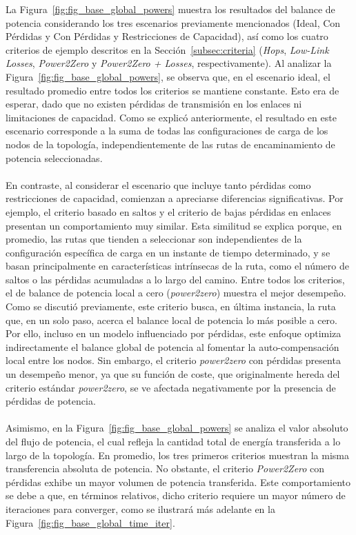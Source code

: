 La Figura~\ref{fig:fig_base_global_powers} muestra los resultados del balance de potencia considerando los tres escenarios previamente mencionados (Ideal, Con Pérdidas y Con Pérdidas y Restricciones de Capacidad), así como los cuatro criterios de ejemplo descritos en la Sección~\ref{subsec:criteria} (\textit{Hops}, \textit{Low-Link Losses}, \textit{Power2Zero} y \textit{Power2Zero + Losses}, respectivamente). Al analizar la Figura~\ref{fig:fig_base_global_powers}, se observa que, en el escenario ideal, el resultado promedio entre todos los criterios se mantiene constante. Esto era de esperar, dado que no existen pérdidas de transmisión en los enlaces ni limitaciones de capacidad. Como se explicó anteriormente, el resultado en este escenario corresponde a la suma de todas las configuraciones de carga de los nodos de la topología, independientemente de las rutas de encaminamiento de potencia seleccionadas. \\
\\
En contraste, al considerar el escenario que incluye tanto pérdidas como restricciones de capacidad, comienzan a apreciarse diferencias significativas. Por ejemplo, el criterio basado en saltos y el criterio de bajas pérdidas en enlaces presentan un comportamiento muy similar. Esta similitud se explica porque, en promedio, las rutas que tienden a seleccionar son independientes de la configuración específica de carga en un instante de tiempo determinado, y se basan principalmente en características intrínsecas de la ruta, como el número de saltos o las pérdidas acumuladas a lo largo del camino.  Entre todos los criterios, el de balance de potencia local a cero (\textit{power2zero}) muestra el mejor desempeño. Como se discutió previamente, este criterio busca, en última instancia, la ruta que, en un solo paso, acerca el balance local de potencia lo más posible a cero. Por ello, incluso en un modelo influenciado por pérdidas, este enfoque optimiza indirectamente el balance global de potencia al fomentar la auto-compensación local entre los nodos. Sin embargo, el criterio \textit{power2zero} con pérdidas presenta un desempeño menor, ya que su función de coste, que originalmente hereda del criterio estándar \textit{power2zero}, se ve afectada negativamente por la presencia de pérdidas de potencia.\\
\\
Asimismo, en la Figura~\ref{fig:fig_base_global_powers} se analiza el valor absoluto del flujo de potencia, el cual refleja la cantidad total de energía transferida a lo largo de la topología. En promedio, los tres primeros criterios muestran la misma transferencia absoluta de potencia. No obstante, el criterio \textit{Power2Zero} con pérdidas exhibe un mayor volumen de potencia transferida. Este comportamiento se debe a que, en términos relativos, dicho criterio requiere un mayor número de iteraciones para converger, como se ilustrará más adelante en la Figura~\ref{fig:fig_base_global_time_iter}.


